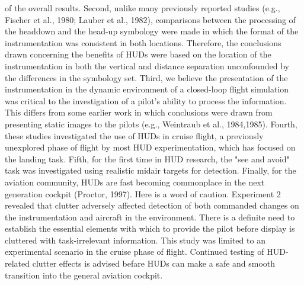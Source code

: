 \documentclass[utf8,bachelor,manualbib]{gradu3}
\begin{document}
of the overall results. Second, unlike many previously reported studies (e.g., Fischer
et al., 1980; Lauber et al., 1982), comparisons between the processing of the headdown
and the head-up symbology were made in which the format of the instrumentation
was consistent in both locations. Therefore, the conclusions drawn concerning
the benefits of HUDs were based on the location of the instrumentation in both the vertical and distance separation unconfounded by the differences in the symbology
set. Third, we believe the presentation of the instrumentation in the dynamic environment
of a closed-loop flight simulation was critical to the investigation of a pilot's
ability to process the information. This differs from some earlier work in which
conclusions were drawn from presenting static images to the pilots (e.g., Weintraub
et al., 1984,1985). Fourth, these studies investigated the use of HUDs in cruise flight,
a previously unexplored phase of flight by most HUD experimentation, which has
focused on the landing task. Fifth, for the first time in HUD research, the "see and
avoid" task was investigated using realistic midair targets for detection.
Finally, for the aviation community, HUDs are fast becoming commonplace in
the next generation cockpit (Proctor, 1997). Here is a word of caution. Experiment
2 revealed that clutter adversely affected detection of both commanded changes on
the instrumentation and aircraft in the environment. There is a definite need to
establish the essential elements with which to provide the pilot before display is
cluttered with task-irrelevant information. This study was limited to an experimental
scenario in the cruise phase of flight. Continued testing of HUD-related clutter
effects is advised befare HUDs can make a safe and smooth transition into the
general aviation cockpit. \citep{ververs1998}
\end{document}
